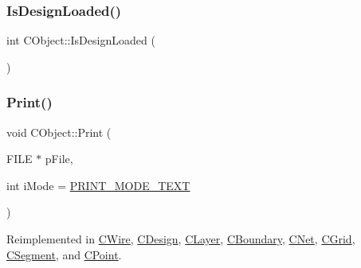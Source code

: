 \mbox{\label{classCObject_af7d0080ca4135e9bbe9e92abfe9f904a}} 
\subsubsection{\texorpdfstring{IsDesignLoaded()}{IsDesignLoaded()}}
{\footnotesize\ttfamily int C\+Object\+::\+Is\+Design\+Loaded (\begin{DoxyParamCaption}{ }\end{DoxyParamCaption})\hspace{0.3cm}{\ttfamily [static]}}

\mbox{\label{classCObject_a75afd905b2d14ed374c75d90f079a389}} 
\subsubsection{\texorpdfstring{Print()}{Print()}}
{\footnotesize\ttfamily void C\+Object\+::\+Print (\begin{DoxyParamCaption}\item[{F\+I\+LE $\ast$}]{p\+File,  }\item[{int}]{i\+Mode = {\ttfamily \mbox{\hyperlink{BoxRouter_8h_a57a837ae96ef88ba334045a535dd3b8e}{P\+R\+I\+N\+T\+\_\+\+M\+O\+D\+E\+\_\+\+T\+E\+XT}}} }\end{DoxyParamCaption})\hspace{0.3cm}{\ttfamily [virtual]}}



Reimplemented in \mbox{\hyperlink{classCWire_a76b2e23a425ddd51f02f41ba2caf3134}{C\+Wire}}, \mbox{\hyperlink{classCDesign_ae6f1b5262fb9420660bd768cb7ae613e}{C\+Design}}, \mbox{\hyperlink{classCLayer_a5bba2c50c546b8e5301370f08e963ee6}{C\+Layer}}, \mbox{\hyperlink{classCBoundary_a12a1e37297bd35f915544d02bd8c0cf1}{C\+Boundary}}, \mbox{\hyperlink{classCNet_a94a51f1ccadf689a3bcfa167f37e12f5}{C\+Net}}, \mbox{\hyperlink{classCGrid_a6462a8c5f7d7b6cbba02bac1d82dcbba}{C\+Grid}}, \mbox{\hyperlink{classCSegment_af1e339a0f89697ab0d851858aab13b89}{C\+Segment}}, and \mbox{\hyperlink{classCPoint_a1610463f19b7ff508ed229791dd6335d}{C\+Point}}.

\mbox{\label{classCObject_a6946fc7b7c10ee357b77dad0466650d2}} 
